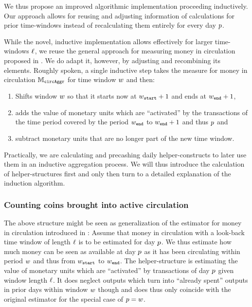 We thus propose an improved algorithmic implementation proceeding inductively. %
Our approach allows for reusing and adjusting information of calculations for prior time-windows instead of recalculating them entirely for every day \({p}\). %

While the novel, inductive implementation allows effectively for larger time-windows \({\ell}\), we reuse the general approach for measuring money in circulation proposed in \cite{pernice2019cryptocurrencies}. %
We do adapt it, however, by adjusting and recombining its elements. %
Roughly spoken, a single inductive step takes the measure for money in circulation \( {\mathbb{M}_{\mathtt{circAggr}}} \) for time window \({w}\) and then: %
\begin{enumerate}
\item Shifts window \({w}\) so that it starts now at \({w}_{{\mathtt{start}}} + 1\) and ends at \({w}_{{\mathtt{end}}} + 1\),
\item adds the value of monetary units which are ``activated'' by the transactions of the time period covered by the period \({w}_{{\mathtt{end}}}\) to \({w}_{{\mathtt{end}}} + 1\) and thus \({p}\) and %
\item subtract monetary units that are no longer part of the new time window. %
\end{enumerate}
Practically, we are calculating and precashing daily helper-constructs to later use them in an inductive aggregation process. %
We will thus introduce the calculation of helper-structures first and only then turn to a detailed explanation of the induction algorithm. %

\subsubsection{Counting coins brought into active circulation}

The above structure might be seen as generalization of the estimator for money in circulation introduced in \cite{pernice2019cryptocurrencies}: %
Assume that money in circulation with a look-back time window of length \({\ell}\) is to be estimated for day \({p}\). %
We thus estimate how much money can be seen as available at day \({p}\) as it has been circulating within period \({w}\) and thus from \({w}_{\mathtt{start}}\) to \({w}_{\mathtt{end}}\). %
The helper-structure is estimating the value of monetary units which are ``activated'' by transactions of day \( {p} \) given window length \({\ell}\). %
It does neglect outputs which turn into ``already spent'' outputs in prior days within window \({w}\) though and does thus only coincide with the original estimator for the special case of \({p} = {w}\). %

